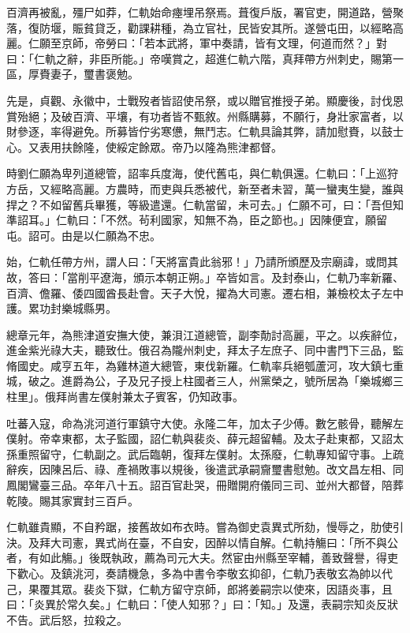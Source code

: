\begin{pinyinscope}
 百濟再被亂，殭尸如莽，仁軌始命瘞埋吊祭焉。葺復戶版，署官吏，開道路，營聚落，復防堰，賑貧貸乏，勸課耕種，為立官社，民皆安其所。遂營屯田，以經略高麗。仁願至京師，帝勞曰：「若本武將，軍中奏請，皆有文理，何道而然？」對曰：「仁軌之辭，非臣所能。」帝嘆賞之，超進仁軌六階，真拜帶方州刺史，賜第一區，厚賚妻子，璽書褒勉。



 先是，貞觀、永徽中，士戰歿者皆詔使吊祭，或以贈官推授子弟。顯慶後，討伐恩賞殆絕；及破百濟、平壤，有功者皆不甄敘。州縣購募，不願行，身壯家富者，以財參逐，率得避免。所募皆佇劣寒憊，無鬥志。仁軌具論其弊，請加慰賚，以鼓士心。又表用扶餘隆，使綏定餘眾。帝乃以隆為熊津都督。



 時劉仁願為卑列道總管，詔率兵度海，使代舊屯，與仁軌俱還。仁軌曰：「上巡狩方岳，又經略高麗。方農時，而吏與兵悉被代，新至者未習，萬一蠻夷生變，誰與捍之？不如留舊兵畢獲，等級遣還。仁軌當留，未可去。」仁願不可，曰：「吾但知準詔耳。」仁軌曰：「不然。茍利國家，知無不為，臣之節也。」因陳便宜，願留屯。詔可。由是以仁願為不忠。



 始，仁軌任帶方州，謂人曰：「天將富貴此翁邪！」乃請所頒歷及宗廟諱，或問其故，答曰：「當削平遼海，頒示本朝正朔。」卒皆如言。及封泰山，仁軌乃率新羅、百濟、儋羅、倭四國酋長赴會。天子大悅，擢為大司憲。遷右相，兼檢校太子左中護。累功封樂城縣男。



 總章元年，為熊津道安撫大使，兼浿江道總管，副李勣討高麗，平之。以疾辭位，進金紫光祿大夫，聽致仕。俄召為隴州刺史，拜太子左庶子、同中書門下三品，監脩國史。咸亨五年，為雞林道大總管，東伐新羅。仁軌率兵絕瓠蘆河，攻大鎮七重城，破之。進爵為公，子及兄子授上柱國者三人，州黨榮之，號所居為「樂城鄉三柱里」。俄拜尚書左僕射兼太子賓客，仍知政事。



 吐蕃入寇，命為洮河道行軍鎮守大使。永隆二年，加太子少傅。數乞骸骨，聽解左僕射。帝幸東都，太子監國，詔仁軌與裴炎、薛元超留輔。及太子赴東都，又詔太孫重照留守，仁軌副之。武后臨朝，復拜左僕射。太孫廢，仁軌專知留守事。上疏辭疾，因陳呂后、祿、產禍敗事以規後，後遣武承嗣齎璽書慰勉。改文昌左相、同鳳閣鸞臺三品。卒年八十五。詔百官赴哭，冊贈開府儀同三司、並州大都督，陪葬乾陵。賜其家實封三百戶。



 仁軌雖貴顯，不自矜踞，接舊故如布衣時。嘗為御史袁異式所劾，慢辱之，肋使引決。及拜大司憲，異式尚在臺，不自安，因醉以情自解。仁軌持觴曰：「所不與公者，有如此觴。」後既執政，薦為司元大夫。然宦由州縣至宰輔，善致聲譽，得吏下歡心。及鎮洮河，奏請機急，多為中書令李敬玄抑卻，仁軌乃表敬玄為帥以代己，果覆其眾。裴炎下獄，仁軌方留守京師，郎將姜嗣宗以使來，因語炎事，且曰：「炎異於常久矣。」仁軌曰：「使人知邪？」曰：「知。」及還，表嗣宗知炎反狀不告。武后怒，拉殺之。




\end{pinyinscope}
